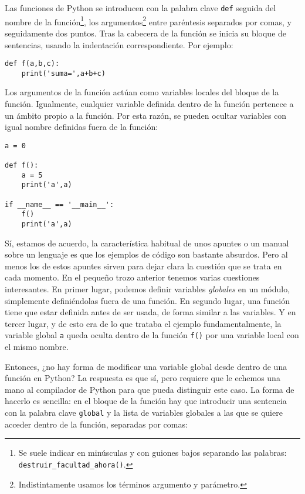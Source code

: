 Las funciones de Python se introducen con la palabra clave \texttt{def} seguida del nombre de la función\footnote{Se suele indicar en minúsculas y con guiones bajos separando las palabras: \texttt{destruir\_facultad\_ahora()}.}, los argumentos\footnote{Indistintamente usamos los términos argumento y parámetro.} entre paréntesis separados por comas, y seguidamente dos puntos. Tras la cabecera de la función se inicia su bloque de sentencias, usando la indentación correspondiente. Por ejemplo:

\begin{lstlisting}
def f(a,b,c):
    print('suma=',a+b+c)
\end{lstlisting}

Los argumentos de la función actúan como variables locales del bloque de la función. Igualmente, cualquier variable definida dentro de la función pertenece a un ámbito propio a la función. Por esta razón, se pueden ocultar variables con igual nombre definidas fuera de la función:

\begin{lstlisting}
a = 0

def f():
    a = 5
    print('a',a)

if __name__ == '__main__':
    f()
    print('a',a)
\end{lstlisting}

Sí, estamos de acuerdo, la característica habitual de unos apuntes o un manual sobre un lenguaje es que los ejemplos de código son bastante absurdos. Pero al menos los de estos apuntes sirven para dejar clara la cuestión que se trata en cada momento. En el pequeño trozo anterior tenemos varias cuestiones interesantes. En primer lugar, podemos definir variables \emph{globales} en un módulo, simplemente definiéndolas fuera de una función. En segundo lugar, una función tiene que estar definida antes de ser usada, de forma similar a las variables. Y en tercer lugar, y de esto era de lo que trataba el ejemplo fundamentalmente, la variable global \texttt{a} queda oculta dentro de la función \texttt{f()} por una variable local con el mismo nombre.

Entonces, ¿no hay forma de modificar una variable global desde dentro de una función en Python? La respuesta es que sí, pero requiere que le echemos una mano al compilador de Python para que pueda distinguir este caso. La forma de hacerlo es sencilla: en el bloque de la función hay que introducir una sentencia con la palabra clave \texttt{global} y la lista de variables globales a las que se quiere acceder dentro de la función, separadas por comas:

